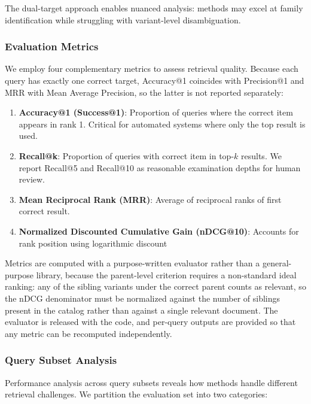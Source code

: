 \documentclass[preprint,12pt]{elsarticle}
\begin{document}
The dual-target approach enables nuanced analysis: methods may excel at family identification while struggling with variant-level disambiguation.

\subsubsection{Evaluation Metrics}
\label{subsec:metrics}

We employ four complementary metrics to assess retrieval quality. Because each query has exactly one correct target, Accuracy@1 coincides with Precision@1 and MRR with Mean Average Precision, so the latter is not reported separately:

\begin{enumerate}
    \item \textbf{Accuracy@1 (Success@1)}: Proportion of queries where the correct item appears in rank 1. Critical for automated systems where only the top result is used.
    
    \item \textbf{Recall@k}: Proportion of queries with correct item in top-$k$ results. We report Recall@5 and Recall@10 as reasonable examination depths for human review.
    
    \item \textbf{Mean Reciprocal Rank (MRR)}: Average of reciprocal ranks of first correct result.
    
    \item \textbf{Normalized Discounted Cumulative Gain (nDCG@10)}: Accounts for rank position using logarithmic discount
\end{enumerate}

Metrics are computed with a purpose-written evaluator rather than a general-purpose library, because the parent-level criterion requires a non-standard ideal ranking: any of the sibling variants under the correct parent counts as relevant, so the nDCG denominator must be normalized against the number of siblings present in the catalog rather than against a single relevant document. The evaluator is released with the code, and per-query outputs are provided so that any metric can be recomputed independently.

\subsubsection{Query Subset Analysis}

Performance analysis across query subsets reveals how methods handle different retrieval challenges. We partition the evaluation set into two categories:
\end{document}
